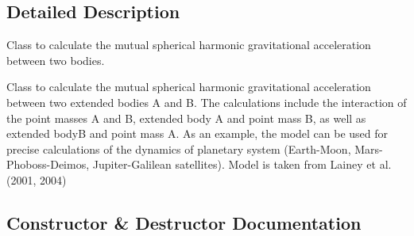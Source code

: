 \subsection{Detailed Description}
Class to calculate the mutual spherical harmonic gravitational acceleration between two bodies. 

Class to calculate the mutual spherical harmonic gravitational acceleration between two extended bodies A and B. The calculations include the interaction of the point masses A and B, extended body A and point mass B, as well as extended bodyB and point mass A. As an example, the model can be used for precise calculations of the dynamics of planetary system (Earth-\/\+Moon, Mars-\/\+Phoboss-\/\+Deimos, Jupiter-\/\+Galilean satellites). Model is taken from Lainey et al. (2001, 2004) 

\subsection{Constructor \& Destructor Documentation}
